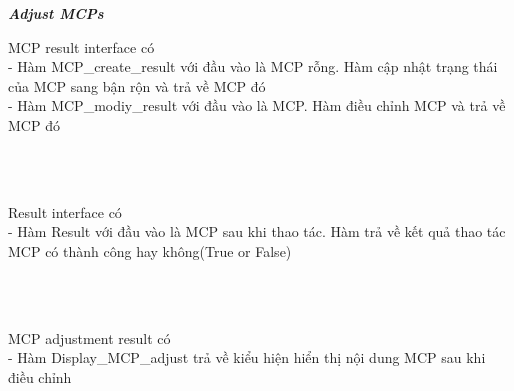 \documentclass[a4paper]{article}
\begin{document}
\begin{itemize}
\newline
\newline
\newpage
\textbf{    \textit{Adjust MCPs} } \\
\begin{minipage}[b]{0.4\textwidth}
 MCP result interface có \\
- Hàm MCP\_create\_result với đầu vào là MCP rỗng. Hàm cập nhật trạng thái của MCP sang bận rộn và trả về MCP đó  \\
-  Hàm MCP\_modiy\_result với đầu vào là MCP. Hàm  điều chỉnh MCP và trả về MCP đó
\end{minipage}
\hfill
{}
\\ \\
\begin{minipage}[b]{0.4\textwidth}
  Result interface có \\
- Hàm Result với đầu vào là MCP sau khi thao tác. Hàm trả về kết quả thao tác MCP có thành công hay không(True or False)
\end{minipage}
\hfill
{}
\\ \\
\begin{minipage}[b]{0.4\textwidth}
MCP adjustment result có \\
- Hàm Display\_MCP\_adjust trả về  kiểu hiện hiển thị nội dung MCP sau khi điều chỉnh
\end{minipage}
\hfill
{}

\end{itemize}
\end{document}
